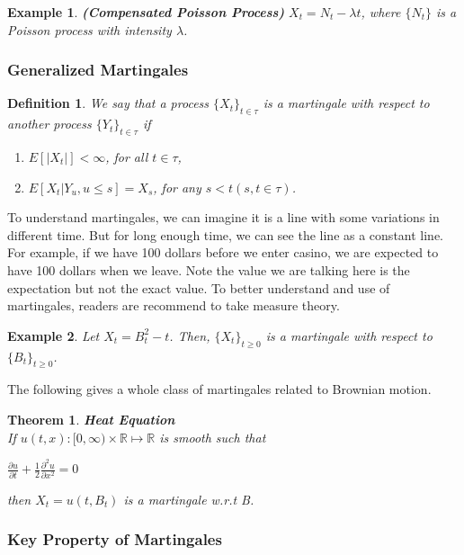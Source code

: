 \documentclass[12pt]{article}
\newtheorem{definition}{Definition}
\newtheorem{theorem}{Theorem}
\newtheorem{example}{Example}
\begin{document}
\begin{example}
    \textbf{(Compensated Poisson Process)} $X_t = N_t - \lambda t$, where $\{N_t\}$ is a Poisson process with intensity $\lambda$.
\end{example}

\subsubsection{Generalized Martingales}

\begin{definition}
    We say that a process $\{X_t\}_{t \in \tau}$ is a martingale with respect to another process $\{Y_t\}_{t \in \tau}$ if
    \begin{enumerate}
        \item $E[|X_t|] < \infty$, for all $t \in \tau$,
        \item $E[X_t | Y_u, u \leq s] = X_s$, for any $s < t (s,t \in \tau)$.
    \end{enumerate}
\end{definition}

\noindent To understand martingales, we can imagine it is a line with some variations in different time. But for long enough time, we can see the line as a constant line. For example, if we have 100 dollars before we enter casino, we are expected to have 100 dollars when we leave. Note the value we are talking here is the expectation but not the exact value. To better understand and use of martingales, readers are recommend to take measure theory.

\begin{example}
    Let $X_t = B^2_t - t$. Then, $\{X_t\}_{t \geq 0}$ is a martingale with respect to $\{B_t\}_{t \geq 0}$.
\end{example}

\noindent The following gives a whole class of martingales related to Brownian motion.
\begin{theorem}
    \textbf{Heat Equation}
    \\If $u(t,x): [0, \infty) \times \mathbb{R} \mapsto \mathbb{R}$ is smooth such that 
    \begin{center}
        $\frac{\partial u}{\partial t} + \frac{1}{2} \frac{\partial^2 u}{\partial x^2} = 0$
    \end{center}
    \noindent then $X_t = u(t, B_t)$ is a martingale w.r.t B.
\end{theorem}

\subsubsection{Key Property of Martingales}
\end{document}
